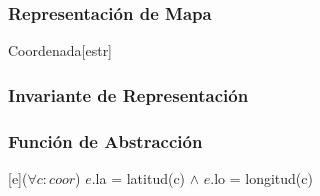 \begin{Representacion}
\subsubsection{Representación de Mapa}
	\begin{Estructura}{Coordenada}[estr]
		\begin{Tupla}[estr]
		\end{Tupla}
	\end{Estructura}

\subsubsection{Invariante de Representación}

\subsubsection{Funci\'on de Abstracci\'on}
	{($\forall c : coor$) $e$.la = latitud(c) $\land$ $e$.lo = longitud(c)}
\end{Representacion}

